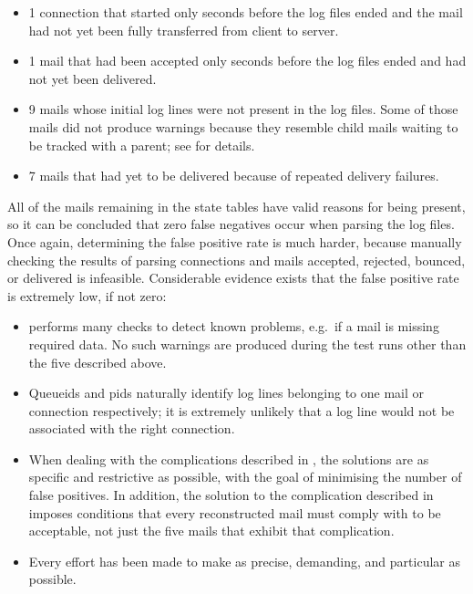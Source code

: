 \begin{itemize}

    \squeezeitems{}

    \item 1 connection that started only seconds before the log files ended
        and the mail had not yet been fully transferred from client to
        server.

    \item 1 mail that had been accepted only seconds before the log files
        ended and had not yet been delivered.

    \item 9 mails whose initial log lines were not present in the log
        files.  Some of those mails did not produce warnings because they
        resemble child mails waiting to be tracked with a parent; see
         for details.

    \item 7 mails that had yet to be delivered because of repeated
        delivery failures.

\end{itemize}

All of the mails remaining in the state tables have valid reasons for being
present, so it can be concluded that zero false negatives occur when
parsing the \numberOFlogFILES{} log files.  Once again, determining the
false positive rate is much harder, because manually checking the results
of parsing \numberOFconnectionsINlogFILES{} connections and mails accepted,
rejected, bounced, or delivered is infeasible.  Considerable evidence
exists that the false positive rate is extremely low, if not zero:

\begin{itemize}

    \item \parsername{} performs many checks to detect known problems,
        e.g.\ if a mail is missing required data.  No such warnings are
        produced during the test runs other than the five described above.

    \item Queueids and \glspl{pid} naturally identify log lines belonging
        to one mail or connection respectively; it is extremely unlikely
        that a log line would not be associated with the right connection.

    \item When dealing with the complications described in
        , the solutions are as specific and
        restrictive as possible, with the goal of minimising the number of
        false positives.  In addition, the solution to the complication
        described in  imposes conditions
        that every reconstructed mail must comply with to be acceptable,
        not just the five mails that exhibit that complication.

    \item Every effort has been made to make \parsername{} as precise,
        demanding, and particular as possible.

\end{itemize}

